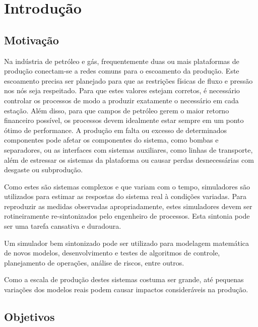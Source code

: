 

\chapter{Introdução} \label{chap:1}



\section{Motivação}
Na indústria de petróleo e gás, frequentemente duas ou mais plataformas de produção conectam-se a redes comuns para o escoamento da produção. 
%
Este escoamento precisa ser planejado para que as restrições físicas de fluxo e pressão nos nós seja respeitado.
%
Para que estes valores estejam corretos, é necessário controlar os processos de modo a produzir exatamente o necessário em cada estação.
%
Além disso, para que campos de petróleo gerem o maior retorno financeiro possível, os processos devem idealmente estar sempre em um ponto ótimo de performance.
%
A produção em falta ou excesso de determinados componentes pode afetar os componentes do sistema, como bombas e separadores, ou as interfaces com sistemas auxiliares, como linhas de transporte, além de estressar os sistemas da plataforma ou causar perdas desnecessárias com desgaste ou subprodução.

Como estes são sistemas complexos e que variam com o tempo, simuladores são utilizados para estimar as respostas do sistema real à condições variadas. 
%
Para reproduzir as medidas observadas apropriadamente, estes simuladores devem ser rotineiramente re-sintonizados pelo engenheiro de processos. 
%
Esta sintonia pode ser uma tarefa cansativa e duradoura.
  
Um simulador bem sintonizado pode ser utilizado para modelagem matemática de novos modelos, desenvolvimento e testes de algoritmos de controle, planejamento de operações, análise de riscos, entre outros.	

Como a escala de produção destes sistemas costuma ser grande, até pequenas variações dos modelos reais podem causar impactos consideráveis na produção.


\section{Objetivos}

